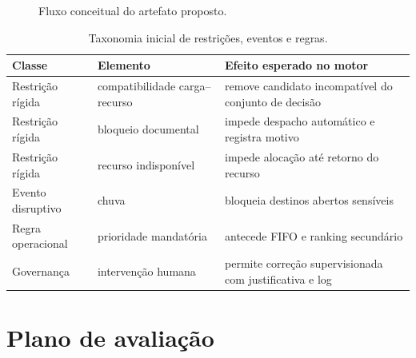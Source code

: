 \documentclass[
  12pt,
  oneside,
  a4paper,
  sumario=tradicional,
  brazil
]{abntex2}
\begin{document}
\begin{figure}[H]
\centering
{}
\caption{Fluxo conceitual do artefato proposto.}
\end{figure}

\begin{table}[H]
\centering
\small
\renewcommand{\arraystretch}{1.18}
\begin{tabularx}{\textwidth}{@{}P{0.22\textwidth}P{0.25\textwidth}Y@{}}
\toprule
\textbf{Classe} & \textbf{Elemento} & \textbf{Efeito esperado no motor} \\
\midrule
Restri\c{c}\~ao r\'igida & compatibilidade carga--recurso & remove candidato incompat\'ivel do conjunto de decis\~ao \\
\addlinespace
Restri\c{c}\~ao r\'igida & bloqueio documental & impede despacho autom\'atico e registra motivo \\
\addlinespace
Restri\c{c}\~ao r\'igida & recurso indispon\'ivel & impede aloca\c{c}\~ao at\'e retorno do recurso \\
\addlinespace
Evento disruptivo & chuva & bloqueia destinos abertos sens\'iveis \\
\addlinespace
Regra operacional & prioridade mandat\'oria & antecede FIFO e ranking secund\'ario \\
\addlinespace
Governan\c{c}a & interven\c{c}\~ao humana & permite corre\c{c}\~ao supervisionada com justificativa e log \\
\bottomrule
\end{tabularx}
\caption{Taxonomia inicial de restri\c{c}\~oes, eventos e regras.}
\end{table}

\chapter{Plano de avalia\c{c}\~ao}
\end{document}
